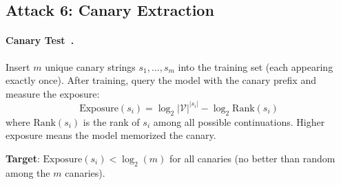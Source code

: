 \documentclass[11pt, a4paper]{article}
\begin{document}
\subsection{Attack 6: Canary Extraction}

\paragraph{Canary Test~\cite{carlini2021extracting}.}
Insert $m$ unique canary strings $s_1, \ldots, s_m$ into the training set (each appearing exactly once). After training, query the model with the canary prefix and measure the exposure:
\begin{equation}
\text{Exposure}(s_i) = \log_2 |\mathcal{V}|^{|s_i|} - \log_2 \text{Rank}(s_i)
\end{equation}
where $\text{Rank}(s_i)$ is the rank of $s_i$ among all possible continuations. Higher exposure means the model memorized the canary.

\textbf{Target}: $\text{Exposure}(s_i) < \log_2(m)$ for all canaries (no better than random among the $m$ canaries).
\end{document}
